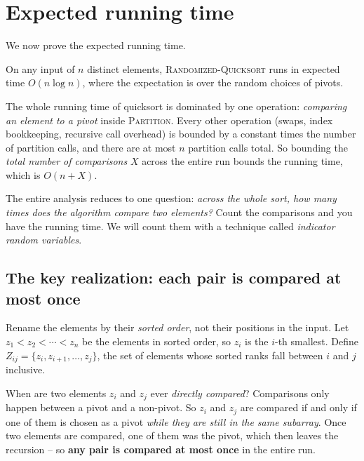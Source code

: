 \section{Expected running time}

We now prove the expected running time.

\begin{theorem}
\label{ch07:expected-time}
On any input of $n$ distinct elements, \textsc{Randomized-Quicksort} runs in
expected time $O(n \log n)$, where the expectation is over the random choices of
pivots.
\end{theorem}

The whole running time of quicksort is dominated by one operation:
\emph{comparing an element to a pivot} inside \textsc{Partition}. Every other
operation (swaps, index bookkeeping, recursive call overhead) is bounded by a
constant times the number of partition calls, and there are at most $n$ partition
calls total. So bounding the \emph{total number of comparisons} $X$ across
the entire run bounds the running time, which is $O(n + X)$.

\begin{focusbox}
The entire analysis reduces to one question: \emph{across the whole sort, how
many times does the algorithm compare two elements?} Count the comparisons and
you have the running time. We will count them with a technique called
\emph{indicator random variables}.
\end{focusbox}

\subsection{The key realization: each pair is compared at most once}

Rename the elements by their \emph{sorted order}, not their positions in
the input. Let $z_1 < z_2 < \cdots < z_n$ be the elements in sorted order, so
$z_i$ is the $i$-th smallest. Define $Z_{ij} = \{z_i, z_{i+1}, \dots, z_j\}$, the
set of elements whose sorted ranks fall between $i$ and $j$ inclusive.

\begin{intuitionbox}
When are two elements $z_i$ and $z_j$ ever
\emph{directly compared}? Comparisons only happen between a pivot and a non-pivot. So $z_i$ and $z_j$ are
compared if and only if one of them is chosen as a pivot \emph{while they are
still in the same subarray}. Once two elements are compared, one of them was the
pivot, which then leaves the recursion -- so \textbf{any pair is compared at most once}
in the entire run.
\end{intuitionbox}

